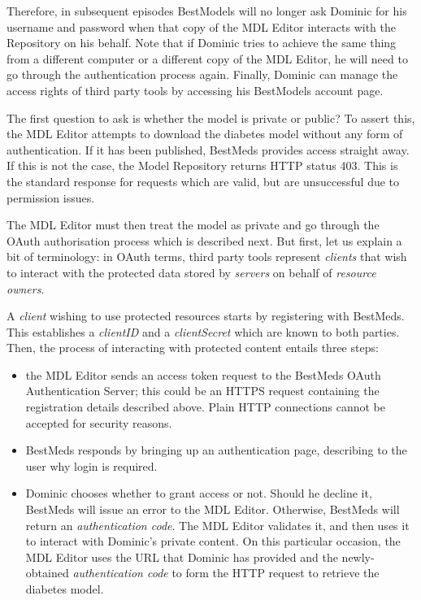 Therefore, in subsequent episodes BestModels will no longer ask Dominic for his username and password when that copy of the MDL Editor interacts with the Repository on his behalf. Note that if Dominic tries to achieve the same thing from a different computer or a different copy of the MDL Editor, he will need to go through the authentication process again. Finally, Dominic can manage the access rights of third party tools by accessing his BestModels account page. 

\begin{techNote}
The first question to ask is whether the model is private or public? To assert this, the MDL Editor attempts to download the diabetes model without any form of authentication. If it has been published, BestMeds provides access straight away. If this is not the case, the Model Repository returns HTTP status 403. This is the standard response for requests which are valid, but are unsuccessful due to permission issues. 

The MDL Editor must then treat the model as private and go through the OAuth authorisation process which is described next. But first, let us explain a bit of terminology: in OAuth terms, third party tools represent \emph{clients} that wish to interact with the protected data stored by \emph{servers} on behalf of \emph{resource owners}. 

A \emph{client} wishing to use protected resources starts by registering with BestMeds. This establishes a \emph{clientID} and a \emph{clientSecret} which are known to both parties. Then, the process of interacting with protected content entails three steps:

\begin{itemize}
\item the MDL Editor sends an access token request to the BestMeds OAuth Authentication Server; this could be an HTTPS request containing the registration details described above. Plain HTTP connections cannot be accepted for security reasons.
\item BestMeds responds by bringing up an authentication page, describing to the user why login is required.
\item Dominic chooses whether to grant access or not. Should he decline it, BestMeds will issue an error to the MDL Editor. Otherwise, BestMeds will return an \emph{authentication code}. The MDL Editor validates it, and then uses it to interact with Dominic's private content. On this particular occasion, the MDL Editor uses the URL that Dominic has provided and the newly-obtained \emph{authentication code} to form the HTTP request to retrieve the diabetes model.
\end{itemize}
\end{techNote}


